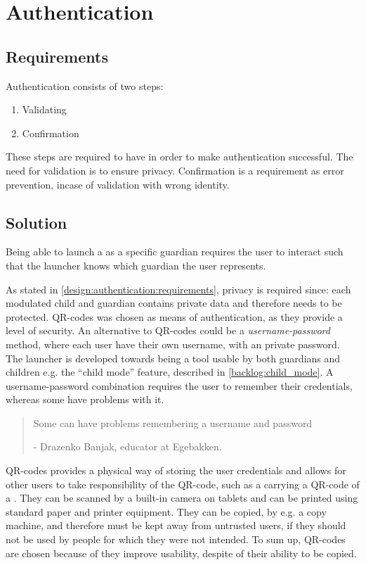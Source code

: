 \section{Authentication}
\label{design:authentication}
\subsection{Requirements}
\label{design:authentication:requirements}

\noindent Authentication consists of two steps:
\begin{enumerate}
	\item Validating
	\item Confirmation
\end{enumerate}
These steps are required to have in order to make authentication successful. The need for validation is to ensure privacy. Confirmation is a requirement as error prevention, incase of validation with wrong identity.
\subsection{Solution}
\label{design:authentication:solution}
Being able to launch a \girafapp[] as a specific guardian requires the user to interact such that the launcher knows which guardian the user represents.

As stated in \autoref{design:authentication:requirements}, privacy is required since: each modulated child and guardian contains private data and therefore needs to be protected.
QR-codes was chosen as means of authentication, as they provide a level of security.
An alternative to QR-codes could be a \emph{username-password} method, where each user have their own username, with an private password.
The launcher is developed towards being a tool usable by both guardians and children e.g. the ``child mode'' feature, described in \autoref{backlog:child_mode}.
A username-password combination requires the user to remember their credentials, whereas some \autists[] have problems with it.

\begin{quotation}
Some \autists[] can have problems remembering a username and password\\ 
	\begin{flushright}
		- Drazenko Banjak, educator at Egebakken.
	\end{flushright}
\end{quotation}

QR-codes provides a physical way of storing the user credentials and allows for other users to take responsibility of the QR-code, such as a \guardian[] carrying a QR-code of a \autist[].
They can be scanned by a built-in camera on tablets and can be printed using standard paper and printer equipment. 
They can be copied, by e.g. a copy machine, and therefore must be kept away from untrusted users, if they should not be used by people for which they were not intended.
To sum up, QR-codes are chosen because of they improve usability, despite of their ability to be copied.  \\

